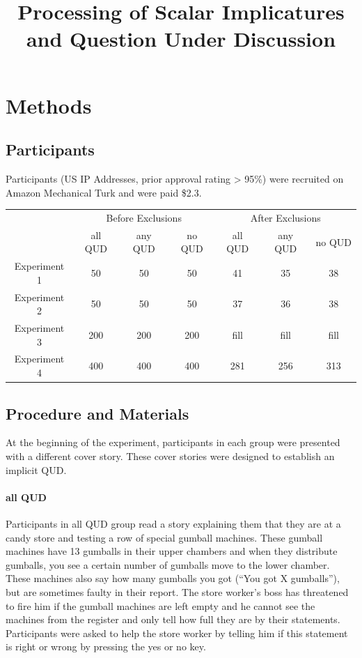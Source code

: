 \documentclass[12pt]{article}
\title{Processing of Scalar Implicatures and Question Under Discussion}
\begin{document}
 

\maketitle 

\section{Methods}

\subsection*{Participants}

Participants (US IP Addresses, prior approval rating > 95\%) were recruited on Amazon Mechanical Turk and were paid \$2.3.

\begin{table}[h]
\begin{tabular}{ccccccc}
& \multicolumn{3}{c}{Before Exclusions} & \multicolumn{3}{c}{After Exclusions} \\
& all QUD & any QUD & no QUD & all QUD & any QUD & no QUD \\
Experiment 1 & 50 & 50 & 50 & 41 & 35 & 38 \\
Experiment 2 & 50 & 50 & 50 & 37 & 36 & 38 \\
Experiment 3 & 200 & 200 & 200 & fill & fill & fill \\
Experiment 4 & 400 & 400 & 400 & 281 & 256 & 313
\end{tabular}
\end{table}

\subsection*{Procedure and Materials}

At the beginning of the experiment, participants in each group were presented with a different cover story. These cover stories were designed to establish an implicit QUD.
\paragraph{all QUD} Participants in all QUD group read a story explaining them that they are at a candy store and testing a row of special gumball machines. These gumball machines have 13 gumballs in their upper chambers and when they distribute gumballs, you see a certain number of gumballs move to the lower chamber. These machines also say how many gumballs you got (“You got X gumballs”), but are sometimes faulty in their report. The store worker’s boss has threatened to fire him if the gumball machines are left empty and he cannot see the machines from the register and only tell how full they are by their statements. Participants were asked to help the store worker by telling him if this statement is right or wrong by pressing the yes or no key.
\end{document}
